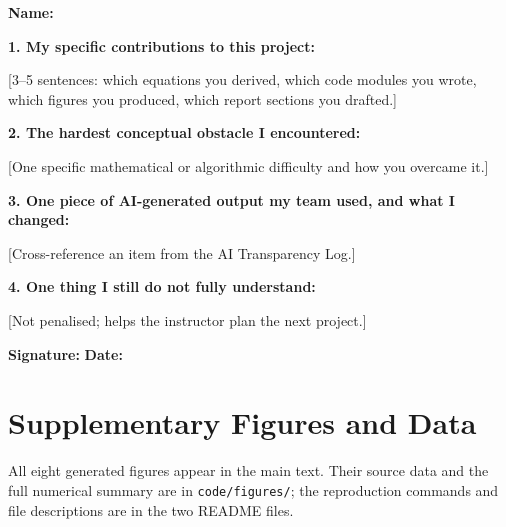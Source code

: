 \documentclass[11pt,a4paper]{article}
\theoremstyle{definition}
\theoremstyle{remark}
\begin{document}
\begin{formbox}
\textbf{Name:} \underline{\hspace{5cm}}

\vspace{0.5em}
\textbf{1. My specific contributions to this project:}

[3--5 sentences: which equations you derived, which code modules you wrote,
which figures you produced, which report sections you drafted.]

\vspace{0.5em}
\textbf{2. The hardest conceptual obstacle I encountered:}

[One specific mathematical or algorithmic difficulty and how you overcame it.]

\vspace{0.5em}
\textbf{3. One piece of AI-generated output my team used, and what I changed:}

[Cross-reference an item from the AI Transparency Log.]

\vspace{0.5em}
\textbf{4. One thing I still do not fully understand:}

[Not penalised; helps the instructor plan the next project.]

\vspace{0.5em}
\textbf{Signature:} \underline{\hspace{4cm}} \quad \textbf{Date:} \underline{\hspace{2cm}}
\end{formbox}

\section{Supplementary Figures and Data}

All eight generated figures appear in the main text. Their source data
and the full numerical summary are in \texttt{code/figures/}; the
reproduction commands and file descriptions are in the two README files.
\end{document}
